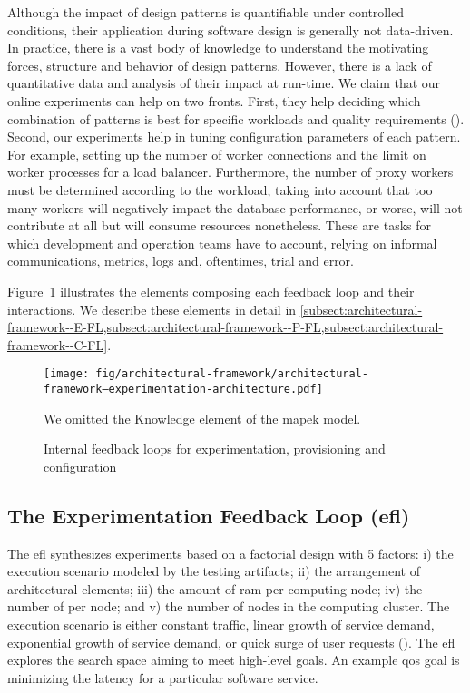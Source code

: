 Although the impact of design patterns is quantifiable under controlled conditions, their application during software design is generally not data-driven. In practice, there is a vast body of knowledge to understand the motivating forces, structure and behavior of design patterns. However, there is a lack of quantitative data and analysis of their impact at run-time. We claim that our online experiments can help on two fronts. First, they help deciding which combination of patterns is best for specific workloads and quality requirements (). Second, our experiments help in tuning configuration parameters of each pattern. For example, setting up the number of worker connections and the limit on worker processes for a load balancer. Furthermore, the number of proxy workers must be determined according to the workload, taking into account that too many workers will negatively impact the database performance, or worse, will not contribute at all but will consume resources nonetheless. These are tasks for which development and operation teams have to account, relying on informal communications, metrics, logs and, oftentimes, trial and error.

Figure~\ref{fig:architectural-framework--experimentation-architecture} illustrates the elements composing each feedback loop and their interactions. We describe these elements in detail in \cref{subsect:architectural-framework--E-FL,subsect:architectural-framework--P-FL,subsect:architectural-framework--C-FL}.

\begin{figure}[h]
	\centering
	\texttt{[image: fig/architectural-framework/architectural-framework--experimentation-architecture.pdf]}
	\caption{Internal feedback loops for experimentation, provisioning and configuration}
	\label{fig:architectural-framework--experimentation-architecture}
	We omitted the Knowledge element of the \gls{mapek} model.
\end{figure}

\subsection{The Experimentation Feedback Loop (\acrshort{efl})}
\label{subsect:architectural-framework--E-FL}

The \gls{efl} synthesizes experiments based on a factorial design with 5 factors: i) the execution scenario modeled by the testing artifacts; ii) the arrangement of architectural elements; iii) the amount of \gls{ram} per computing node; iv) the number of  per node; and v) the number of nodes in the computing cluster. The execution scenario is either constant traffic, linear growth of service demand, exponential growth of service demand, or quick surge of user requests (). The \gls{efl} explores the search space aiming to meet high-level  goals. An example \gls{qos} goal is minimizing the latency for a particular software service.

